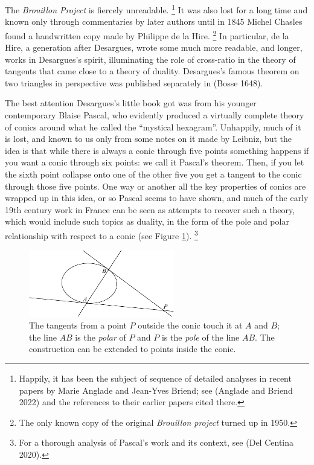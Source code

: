 The  \emph{Brouillon Project} is fiercely unreadable.%
%
\footnote{Happily,
it has been the subject of sequence of detailed analyses in recent papers
by Marie  Anglade and Jean-Yves Briend; see (Anglade and Briend 2022)
and the references to their earlier papers cited there.} 
%
It was also lost
for a long time and known only through commentaries by later authors
until in 1845 Michel Chasles found a handwritten copy made by Philippe
de la Hire.%
\footnote{The only known copy of the original \emph{Brouillon
project} turned up in 1950.}
%
In particular, de la Hire, a generation after
Desargues, wrote some much more readable, and longer, works in Desargues's
spirit, illuminating the role of cross-ratio in the theory of tangents
that came close to a theory of duality. Desargues's famous theorem on
two triangles in perspective was published separately in (Bosse 1648).

The best attention Desargues's little book got was from his younger
contemporary Blaise Pascal, who evidently produced a virtually
complete theory of conics around what he called the ``mystical
hexagram''. Unhappily, much of it is lost, and known to us only from
some notes on it made by Leibniz, but the idea is that while there is
always a conic through five points something happens if you want a conic
through six points: we call it Pascal's theorem. Then, if you let the
sixth point collapse onto one of the other five you get a tangent to the
conic through those five points. One way or another all the key properties
of conics are wrapped up in this idea, or so Pascal seems to have shown,
and much of the early 19th century work in France can be seen as attempts
to recover such a theory, which would include such topics as duality,
in the form of the pole and polar relationship with respect to a conic
(see Figure \ref{figpolepolar}).%
%
\footnote{For a thorough analysis of
Pascal's work and its context, see (Del Centina 2020).}

\begin{figure}
\includegraphics[width=180pt]{main/poleandpolar}
\caption{The tangents from a point $P$ outside the conic touch it at
  $A$ and $B$; the line $AB$ is the \emph{polar} of $P$ and $P$ is the
  \emph{pole} of the line $AB$. The construction can be extended to
  points inside the conic.}
      \label{figpolepolar}
\end{figure}

